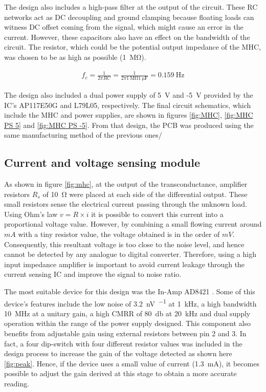 The design also includes a high-pass filter at the output of the circuit. These RC networks act as DC decoupling and ground clamping because floating loads can witness DC offset coming from the signal, which might cause an error in the current. However, these capacitors also have an effect on the bandwidth of the circuit. The resistor, which could be the potential output impedance of the MHC, was chosen to be as high as possible (\SI{1}{\mega\ohm}).

\begin{align}
	\label{eq:MHC filter}
	f_c = \frac{1}{2 \pi R C} = \frac{1}{2 \pi \SI{1}{\mega\ohm} \SI{1}{\micro\farad}} = \SI{0.159}{\hertz}
\end{align}

The design also included a dual power supply of \SI{5}{\volt} and -\SI{5}{\volt} provided by the IC's AP117E50G and L79L05, respectively. The final circuit schematics, which include the MHC and power supplies, are shown in figures \ref{fig:MHC}, \ref{fig:MHC PS 5} and \ref{fig:MHC PS -5}. From that design, the PCB was produced using the same manufacturing method of the previous ones/

\subsection{Current and voltage sensing module}
\label{section V&I sense}
As shown in figure \ref{fig:mhc}, at the output of the transconductance, amplifier resistors $R_s$ of \SI{10}{\ohm} were placed at each side of the differential output. These small resistors sense the electrical current passing through the unknown load. Using Ohm's law $v=R \times i$ it is possible to convert this current into a proportional voltage value. However, by combining a small flowing current around $mA$ with a tiny resistor value, the voltage obtained is in the order of $mV$. Consequently, this resultant voltage is too close to the noise level, and hence cannot be detected by any analogue to digital converter. Therefore, using a high input impedance amplifier is important to avoid current leakage through the current sensing IC and improve the signal to noise ratio.  

The most suitable device for this design was the In-Amp AD8421 \cite{ad:AD8421}. Some of this device's features include the low noise of \SI{3.2}{\nano\volt\per{}} at \SI{1}{\kHz}, a high bandwidth \SI{10}{\MHz} at a unitary gain, a high CMRR of \SI{80}{\decibel} at \SI{20}{\kHz} and dual supply operation within the range of the power supply designed. This component also benefits from adjustable gain using external resistors between pin 2 and 3. In fact, a four dip-switch with four different resistor values was included in the design process to increase the gain of the voltage detected as shown here \ref{fig:peak}. Hence, if the device uses a small value of current (\SI{1.3}{\mA}), it becomes possible to adjust the gain derived at this stage to obtain a more accurate reading.

